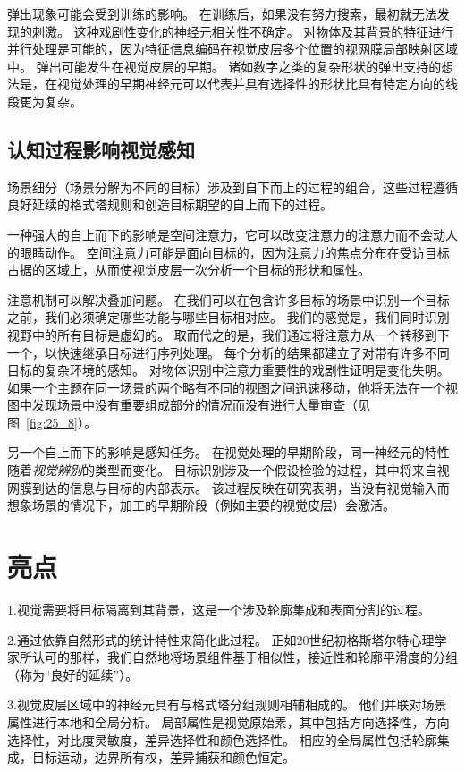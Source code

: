 弹出现象可能会受到训练的影响。
在训练后，如果没有努力搜索，最初就无法发现的刺激。 
这种戏剧性变化的神经元相关性不确定。
对物体及其背景的特征进行并行处理是可能的，因为特征信息编码在视觉皮层多个位置的视网膜局部映射区域中。
弹出可能发生在视觉皮层的早期。
诸如数字之类的复杂形状的弹出支持的想法是，在视觉处理的早期神经元可以代表并具有选择性的形状比具有特定方向的线段更为复杂。



\subsection{认知过程影响视觉感知}

场景细分（场景分解为不同的目标）涉及到自下而上的过程的组合，这些过程遵循良好延续的格式塔规则和创造目标期望的自上而下的过程。


一种强大的自上而下的影响是空间注意力，它可以改变注意力的注意力而不会动人的眼睛动作。
空间注意力可能是面向目标的，因为注意力的焦点分布在受访目标占据的区域上，从而使视觉皮层一次分析一个目标的形状和属性。


注意机制可以解决叠加问题。
在我们可以在包含许多目标的场景中识别一个目标之前，我们必须确定哪些功能与哪些目标相对应。
我们的感觉是，我们同时识别视野中的所有目标是虚幻的。
取而代之的是，我们通过将注意力从一个转移到下一个，以快速继承目标进行序列处理。
每个分析的结果都建立了对带有许多不同目标的复杂环境的感知。
对物体识别中注意力重要性的戏剧性证明是变化失明。
如果一个主题在同一场景的两个略有不同的视图之间迅速移动，他将无法在一个视图中发现场景中没有重要组成部分的情况而没有进行大量审查（见图~\ref{fig:25_8}）。


另一个自上而下的影响是感知任务。
在视觉处理的早期阶段，同一神经元的特性随着\textit{视觉辨别}的类型而变化。
目标识别涉及一个假设检验的过程，其中将来自视网膜到达的信息与目标的内部表示。
该过程反映在研究表明，当没有视觉输入而想象场景的情况下，加工的早期阶段（例如主要的视觉皮层）会激活。



\section{亮点}

1.视觉需要将目标隔离到其背景，这是一个涉及轮廓集成和表面分割的过程。 


2.通过依靠自然形式的统计特性来简化此过程。
正如20世纪初格斯塔尔特心理学家所认可的那样，我们自然地将场景组件基于相似性，接近性和轮廓平滑度的分组（称为“良好的延续”）。


3.视觉皮层区域中的神经元具有与格式塔分组规则相辅相成的。
他们并联对场景属性进行本地和全局分析。
局部属性是视觉原始素，其中包括方向选择性，方向选择性，对比度灵敏度，差异选择性和颜色选择性。
相应的全局属性包括轮廓集成，目标运动，边界所有权，差异捕获和颜色恒定。


